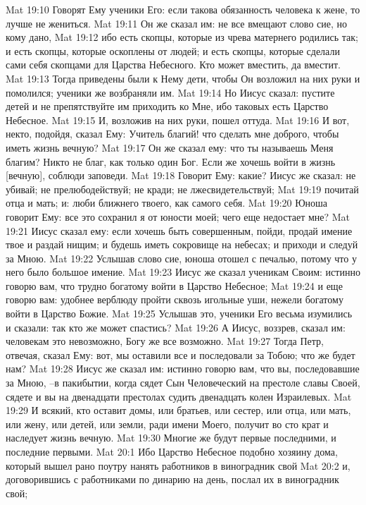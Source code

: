 Mat 19:10  Говорят Ему ученики Его: если такова обязанность человека к жене, то лучше не жениться.
Mat 19:11  Он же сказал им: не все вмещают слово сие, но кому дано,
Mat 19:12  ибо есть скопцы, которые из чрева матернего родились так; и есть скопцы, которые оскоплены от людей; и есть скопцы, которые сделали сами себя скопцами для Царства Небесного. Кто может вместить, да вместит.
Mat 19:13  Тогда приведены были к Нему дети, чтобы Он возложил на них руки и помолился; ученики же возбраняли им.
Mat 19:14  Но Иисус сказал: пустите детей и не препятствуйте им приходить ко Мне, ибо таковых есть Царство Небесное.
Mat 19:15  И, возложив на них руки, пошел оттуда.
Mat 19:16  И вот, некто, подойдя, сказал Ему: Учитель благий! что сделать мне доброго, чтобы иметь жизнь вечную?
Mat 19:17  Он же сказал ему: что ты называешь Меня благим? Никто не благ, как только один Бог. Если же хочешь войти в жизнь [вечную], соблюди заповеди.
Mat 19:18  Говорит Ему: какие? Иисус же сказал: не убивай; не прелюбодействуй; не кради; не лжесвидетельствуй;
Mat 19:19  почитай отца и мать; и: люби ближнего твоего, как самого себя.
Mat 19:20  Юноша говорит Ему: все это сохранил я от юности моей; чего еще недостает мне?
Mat 19:21  Иисус сказал ему: если хочешь быть совершенным, пойди, продай имение твое и раздай нищим; и будешь иметь сокровище на небесах; и приходи и следуй за Мною.
Mat 19:22  Услышав слово сие, юноша отошел с печалью, потому что у него было большое имение.
Mat 19:23  Иисус же сказал ученикам Своим: истинно говорю вам, что трудно богатому войти в Царство Небесное;
Mat 19:24  и еще говорю вам: удобнее верблюду пройти сквозь игольные уши, нежели богатому войти в Царство Божие.
Mat 19:25  Услышав это, ученики Его весьма изумились и сказали: так кто же может спастись?
Mat 19:26  А Иисус, воззрев, сказал им: человекам это невозможно, Богу же все возможно.
Mat 19:27  Тогда Петр, отвечая, сказал Ему: вот, мы оставили все и последовали за Тобою; что же будет нам?
Mat 19:28  Иисус же сказал им: истинно говорю вам, что вы, последовавшие за Мною, --в пакибытии, когда сядет Сын Человеческий на престоле славы Своей, сядете и вы на двенадцати престолах судить двенадцать колен Израилевых.
Mat 19:29  И всякий, кто оставит домы, или братьев, или сестер, или отца, или мать, или жену, или детей, или земли, ради имени Моего, получит во сто крат и наследует жизнь вечную.
Mat 19:30  Многие же будут первые последними, и последние первыми.
Mat 20:1  Ибо Царство Небесное подобно хозяину дома, который вышел рано поутру нанять работников в виноградник свой
Mat 20:2  и, договорившись с работниками по динарию на день, послал их в виноградник свой;
